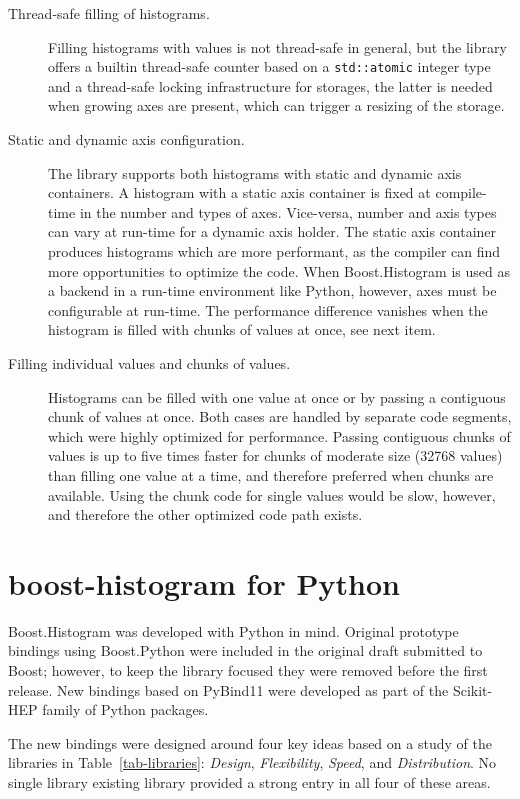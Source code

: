 \documentclass{webofc}
\begin{document}
\begin{description}
\item[Thread-safe filling of histograms.] Filling histograms with values is not thread-safe in general, but the library offers a builtin thread-safe counter based on a \verb|std::atomic| integer type and a thread-safe locking infrastructure for storages, the latter is needed when growing axes are present, which can trigger a resizing of the storage.

\item[Static and dynamic axis configuration.] The library supports both histograms with static and dynamic axis containers. A histogram with a static axis container is fixed at compile-time in the number and types of axes. Vice-versa, number and axis types can vary at run-time for a dynamic axis holder. The static axis container produces histograms which are more performant, as the compiler can find more opportunities to optimize the code. When Boost.Histogram is used as a backend in a run-time environment like Python, however, axes must be configurable at run-time. The performance difference vanishes when the histogram is filled with chunks of values at once, see next item.

\item[Filling individual values and chunks of values.] Histograms can be filled with one value at once or by passing a contiguous chunk of values at once. Both cases are handled by separate code segments, which were highly optimized for performance. Passing contiguous chunks of values is up to five times faster for chunks of moderate size (32768 values) than filling one value at a time, and therefore preferred when chunks are available. Using the chunk code for single values would be slow, however, and therefore the other optimized code path exists.
\end{description}

\section{boost-histogram for Python}
\label{sec-bhp-intro}

Boost.Histogram was developed with Python in mind. Original prototype bindings using Boost.Python were included in the original draft submitted to Boost; however, to keep the library focused they were removed before the first release. New bindings based on PyBind11 were developed as part of the Scikit-HEP family of Python packages.

The new bindings were designed around four key ideas based on a study of the libraries in Table~\ref{tab-libraries}: \emph{Design}, \emph{Flexibility}, \emph{Speed}, and \emph{Distribution}. No single library existing library provided a strong entry in all four of these areas.
\end{document}
